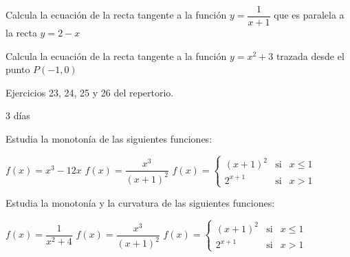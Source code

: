 \begin{ejemplo}{
    Calcula la ecuación de la recta tangente a la función $y=\dfrac1{x+1}$ que es paralela a la recta $y=2-x$
}
\end{ejemplo}

\begin{ejemplo}{
    Calcula la ecuación de la recta tangente a la función $y=x^2+3$ trazada desde el punto $P(-1,0)$
}
\end{ejemplo}

\begin{ejercicios}
    \ej Ejercicios 23, 24, 25 y 26 del repertorio.
\end{ejercicios}

\begin{definicion}{3 días}
\end{definicion}

\begin{ejemplo}{
Estudia la monotonía de las siguientes funciones:
\begin{apartados}
 \ap\vspace{3mm} $f(x)=x^3-12x$
 \ap $f(x)=\dfrac{x^3}{(x+1)^2}$
 \ap $f(x)=\left\{\begin{array}{ccc}
        (x+1)^2&\text{si}&x\leqslant1\\[10pt]
        2^{x+1}&\text{si}&x>1
    \end{array}\right.$
\end{apartados}}


\end{ejemplo}

\begin{ejemplo}{
Estudia la monotonía y la curvatura de las siguientes funciones:
\begin{apartados}
 \ap\vspace{3mm} $f(x)=\dfrac1{x^2+4}$
 \ap $f(x)=\dfrac{x^3}{(x+1)^2}$
 \ap $f(x)=\left\{\begin{array}{ccc}
        (x+1)^2&\text{si}&x\leqslant1\\[10pt]
        2^{x+1}&\text{si}&x>1
    \end{array}\right.$
\end{apartados}}


\end{ejemplo}


